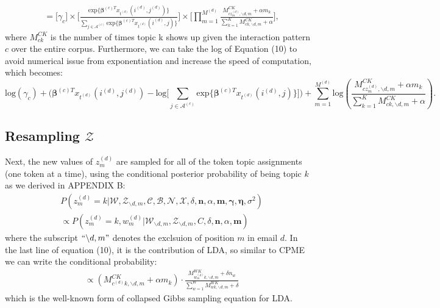 \documentclass[a4paper]{article}
\begin{document}
   \begin{equation}
   \begin{aligned} &=\Big[ \gamma_{c}\Big]\times\Big[ \frac{\mbox{exp}\{\boldsymbol{\beta}^{(c)T}x_{t^{(d)}}(i^{(d)}, j^{(d)})\}}{\sum_{j\in \mathcal{A}^{(c)}} \mbox{exp}\{\boldsymbol{\beta}^{(c)T}x_{t^{(d)}}(i^{(d)}, j)\}}\Big]\times\Big[\prod_{m=1}^{M^{(d)}}
    \frac{M^{CK}_{cz_m^{(d)}, \backslash d, m}+\alpha m_k}{\sum_{k=1}^KM^{CK}_{ck, \backslash d, m}+\alpha}\Big],
   \end{aligned}
   \end{equation}
where $M^{CK}_{ck}$ is the number of times topic k shows up given the interaction pattern $c$ over the entire corpus. Furthermore, we can take the log of Equation (10) to avoid numerical issue from exponentiation and increase the speed of computation, which becomes:
  	 \begin{equation}
\mbox{log}(\gamma_{c})+\Big(\boldsymbol{\beta}^{(c)T}x_{t^{(d)}}(i^{(d)}, j^{(d)})-\mbox{log}\big[\sum_{j\in \mathcal{A}^{(c)}}\mbox{exp}\{\boldsymbol{\beta}^{(c)T}x_{t^{(d)}}(i^{(d)}, j)\}\big]\Big)+\sum_{m=1}^{M^{(d)}}\mbox{log}(\frac{M^{CK}_{cz_m^{(d)}, \backslash d, m}+\alpha m_k}{\sum_{k=1}^KM^{CK}_{ck, \backslash d, m}+\alpha}).
  	 \end{equation}
  \subsection{Resampling $\mathcal{Z}$}
Next, the new values of $z^{(d)}_m$ are sampled for all of the token topic assignments (one token at a time), using the conditional posterior probability of being topic $k$ as we derived in APPENDIX B:
\begin{equation}
\begin{aligned} & 
 P(z^{(d)}_m=k|\mathcal{W}, \mathcal{Z}_{\backslash d, m},  \mathcal{C}, \mathcal{B}, \mathcal{N}, \mathcal{X}, \delta, \boldsymbol{n}, \alpha, \boldsymbol{m}, \boldsymbol{\gamma}, \boldsymbol{\eta}, \sigma^2)\\
& \propto P(z^{(d)}_m=k, w^{(d)}_m|\mathcal{W}_{\backslash d, m}, \mathcal{Z}_{\backslash d,m}, C, \delta, \boldsymbol{n}, \alpha, \boldsymbol{m})
\end{aligned}
\end{equation}
where the subscript $``{\backslash d, m}"$ denotes the exclsuion of position $m$ in email $d$. In the last line of equation (10), it is the contribution of LDA, so similar to CPME we can write the conditional probability:
	\begin{equation}
	\begin{aligned} 
	& \propto(M^{CK}_{c^{(d)}k, \backslash d, m}+\alpha m_k)\cdot\frac{M_{w_m^{(d)}k, \backslash d, m}^{WK}+\delta n_w}{\sum_{w=1}^WM_{wk,  \backslash d, m}^{WK}+\delta}
	\end{aligned}
	\end{equation}
	which is the well-known form of collapsed Gibbs sampling equation for LDA.
\end{document}
